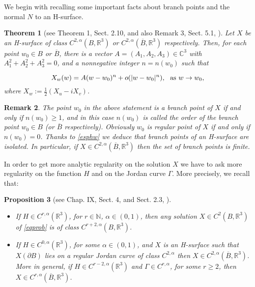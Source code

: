 \documentclass[a4paper,reqno,10pt,oneside]{amsart}
\numberwithin{equation}{section}
\newtheorem{theorem}{Theorem}[section]
\newtheorem{proposition}[theorem]{Proposition}
\newtheorem{remark}[theorem]{Remark}
\begin{document}
We begin with recalling some important facts about branch points and the normal $N$ to an H-surface.
\begin{theorem}[see Theorem 1, Sect. 2.10, \cite{RegMinSurf} and also Remark 3, Sect. 5.1, \cite{MinSurf}] \label{HWexpansion}
 Let $X$ be an H-surface of class $C^{2,\alpha}(B, {\mathbb R}^3)$ or $C^{2,\alpha}(\overline{B}, {\mathbb R}^3)$ respectively. Then, for each point $w_0 \in B$ or $\overline{B}$, there is a vector $A=(A_1,A_2,A_3) \in \mathbb{C}^3$ with $A_1^2+A_2^2+A_3^2=0$, and a nonnegative integer $n=n(w_0)$ such that

\begin{equation}\label{esphw}
X_w(w)=A(w-w_0)^n + o(|w-w_0|^n), \ \ \hbox{as} \ w \to w_0,
\end{equation}
where $X_w:=\frac{1}{2}(X_u-iX_v)$.
\end{theorem}

\begin{remark}
The point $w_0$ in the above statement is a branch point of $X$ if and only if $n(w_0)\geq 1$, and in this case $n(w_0)$ is called the order of the branch point $w_0 \in B$ (or $\overline{B}$ respectively). Obviously $w_0$ is regular point of $X$ if and only if $n(w_0)=0$. Thanks to \eqref{esphw} we deduce that branch points of an H-surface are isolated. In particular, if $X \in C^{2,\alpha}(\overline{B}, {\mathbb R}^3)$ then the set of branch points is finite. 
\end{remark}

In order to get more analytic regularity on the solution $X$ we have to ask more regularity on the function $H$ and on the Jordan curve $\Gamma$.  More precisely, we recall that:
\begin{proposition}[see Chap. IX, Sect. 4, \cite{Sauvigny2006} and Sect. 2.3, \cite{RegMinSurf}] \label{regpropbhdata}
\ \ \ \ \ \ \ 
\begin{itemize}
\item[(i)]If $H \in C^{r,\alpha}({\mathbb R}^3)$, for $r \in \mathbb{N}$, $\alpha \in (0,1)$, then any solution $X \in C^2(B,{\mathbb R}^3)$ of \eqref{eqprob} is of class $C^{r+2,\alpha}(B,{\mathbb R}^3)$.
\item[(ii)] If $H \in C^{0,\alpha}({\mathbb R}^3)$, for some $\alpha \in (0,1)$, and $X$ is an H-surface such that $X(\partial B)$ lies on a regular Jordan curve of class $C^{2,\alpha}$ then $X \in C^{2,\alpha}(\overline{B}, {\mathbb R}^3)$. More in general, if $H \in C^{r-2,\alpha}({\mathbb R}^3)$ and $\Gamma \in C^{r,\alpha}$, for some $r\geq 2$, then $X \in C^{r,\alpha}(\overline{B}, {\mathbb R}^3)$. 
\end{itemize}
 \end{proposition}
\end{document}

